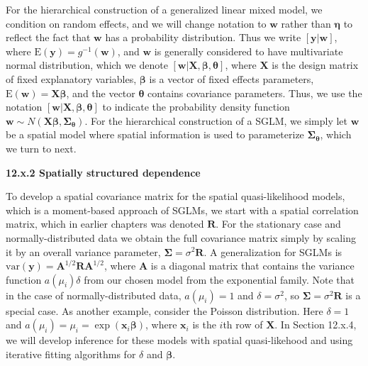 \documentclass[12pt, titlepage]{article}
\begin{document}
For the hierarchical construction of a generalized linear mixed model, we condition on random effects, and we will change notation to $\mathbf{w}$ rather than $\boldsymbol{\eta}$ to reflect the fact that $\mathbf{w}$ has a probability distribution. Thus we write $[\mathbf{y}|\mathbf{w}]$, where $\textrm{E}(\mathbf{y}) = g^{-1}(\mathbf{w})$, and $\mathbf{w}$ is generally considered to have multivariate normal distribution, which we denote $[\mathbf{w}|\mathbf{X}, \boldsymbol{\beta}, \boldsymbol{\theta}]$, where $\mathbf{X}$ is the design matrix of fixed explanatory variables, $\boldsymbol{\beta}$ is a vector of fixed effects parameters, $\textrm{E}(\mathbf{w}) = \mathbf{X}\boldsymbol{\beta}$, and the vector $\boldsymbol{\theta}$ contains covariance parameters.   Thus, we use the notation $[\mathbf{w}|\mathbf{X},\boldsymbol{\beta},\boldsymbol{\theta}]$ to indicate the probability density function $\mathbf{w} \sim N(\mathbf{X}\boldsymbol{\beta},\boldsymbol{\Sigma}_{\boldsymbol{\theta}})$. For the hierarchical construction of a SGLM, we simply let $\mathbf{w}$ be a spatial model where spatial information is used to parameterize $\boldsymbol{\Sigma}_{\boldsymbol{\theta}}$, which we turn to next.

   

{\large \flushleft \textbf{12.x.2 Spatially structured dependence}}

To develop a spatial covariance matrix for the spatial quasi-likelihood models, which is a moment-based approach of SGLMs, we start with a spatial correlation matrix, which in earlier chapters was denoted $\mathbf{R}$.  For the stationary case and normally-distributed data we obtain the full covariance matrix simply by scaling it by an overall variance parameter, $\boldsymbol{\Sigma} = \sigma^{2}\mathbf{R}$. A generalization for SGLMs is $\textrm{var}(\mathbf{y}) = \mathbf{A}^{1/2}\mathbf{R}\mathbf{A}^{1/2}$, where $\mathbf{A}$ is a diagonal matrix that contains the variance function $a(\mu_{i})\delta$ from our chosen model from the exponential family.  Note that in the case of normally-distributed data, $a(\mu_{i}) = 1$ and $\delta = \sigma^{2}$, so $\boldsymbol{\Sigma} = \sigma^{2}\mathbf{R}$ is a special case.  As another example, consider the Poisson distribution.  Here $\delta = 1$ and $a(\mu_{i}) = \mu_{i} = \exp(\mathbf{x}_{i}\boldsymbol{\beta})$, where $\mathbf{x}_{i}$ is the $i$th row of $\mathbf{X}$.  In Section 12.x.4, we will develop inference for these models with spatial quasi-likehood and using iterative fitting algorithms for $\delta$ and $\boldsymbol{\beta}$.
\end{document}
